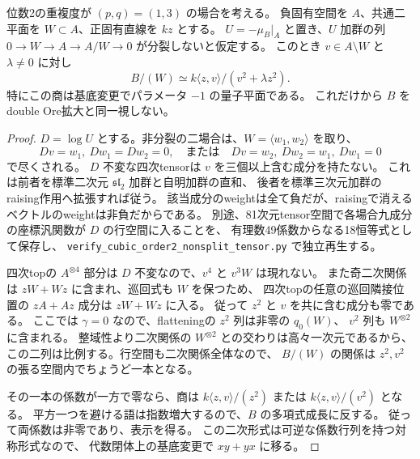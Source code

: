 \begin{proposition}[非分裂Jordan拡大の二平面商]
\label{prop:h3-order2-nonsplit-plane-quotient}
位数2の重複度が $(p,q)=(1,3)$ の場合を考える。
負固有空間を $A$、共通二平面を $W\subset A$、正固有直線を $kz$ とする。
$U=-\mu_B|_A$ と置き、$U$ 加群の列
$0\to W\to A\to A/W\to0$ が分裂しないと仮定する。
このとき $v\in A\setminus W$ と $\lambda\ne0$ に対し
\[
 B/(W)\simeq k\langle z,v\rangle/(v^2+\lambda z^2).
\]
特にこの商は基底変更でパラメータ $-1$ の量子平面である。
これだけから $B$ をdouble Ore拡大と同一視しない。
\end{proposition}
\begin{proof}
$D=\log U$ とする。非分裂の二場合は、$W=\langle w_1,w_2\rangle$ を取り、
\[
 Dv=w_1,\ Dw_1=Dw_2=0,
 \quad\text{または}\quad
 Dv=w_2,\ Dw_2=w_1,\ Dw_1=0
\]
で尽くされる。
$D$ 不変な四次tensorは $v$ を三個以上含む成分を持たない。
これは前者を標準二次元 $\mathfrak{sl}_2$ 加群と自明加群の直和、
後者を標準三次元加群のraising作用へ拡張すれば従う。
該当成分のweightは全て負だが、raisingで消えるベクトルのweightは非負だからである。
別途、81次元tensor空間で各場合九成分の座標汎関数が $D$ の行空間に入ることを、
有理数49係数からなる18恒等式として保存し、
\texttt{verify\_\allowbreak{}cubic\_\allowbreak{}order2\_\allowbreak{}nonsplit\_\allowbreak{}tensor.py}
で独立再生する。

四次topの $A^{\otimes4}$ 部分は $D$ 不変なので、$v^4$ と $v^3W$ は現れない。
また奇二次関係は $zW+Wz$ に含まれ、巡回式も $W$ を保つため、
四次topの任意の巡回隣接位置の $zA+Az$ 成分は $zW+Wz$ に入る。
従って $z^2$ と $v$ を共に含む成分も零である。
ここでは $\gamma=0$ なので、flatteningの $z^2$ 列は非零の $q_0(W)$、
$v^2$ 列も $W^{\otimes2}$ に含まれる。
整域性より二次関係の $W^{\otimes2}$ との交わりは高々一次元であるから、
この二列は比例する。行空間も二次関係全体なので、
$B/(W)$ の関係は $z^2,v^2$ の張る空間内でちょうど一本となる。

その一本の係数が一方で零なら、商は
$k\langle z,v\rangle/(z^2)$ または $k\langle z,v\rangle/(v^2)$ となる。
平方一つを避ける語は指数増大するので、$B$ の多項式成長に反する。
従って両係数は非零であり、表示を得る。
この二次形式は可逆な係数行列を持つ対称形式なので、
代数閉体上の基底変更で $xy+yx$ に移る。
\end{proof}

